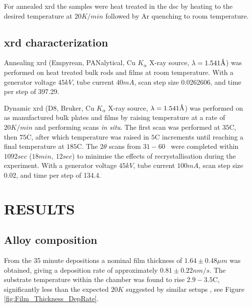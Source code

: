 \documentclass[a4paper,12pt,oneside]{article}%
\begin{document}
For annealed \acrshort{xrd} the samples were heat treated in the \acrshort{dsc} by heating to the desired temperature at $20 K/min$ followed by Ar quenching to room temperature.

\subsection{\acrshort{xrd} characterization}
Annealing \acrshort{xrd} (Empyrean, PANalytical, Cu $K_{\alpha}$ X-ray source, $\lambda = 1.541 \mbox{\normalfont\AA}$) was performed on heat treated bulk rods and films at room temperature. 
With a generator voltage $45 kV$, tube current $40 mA$, scan step size 0.0262606, and time per step of 397.29. 

Dynamic \acrshort{xrd} (D8, Bruker, Cu $K_{\alpha}$ X-ray source, $\lambda = 1.541 \mbox{\normalfont\AA}$) was performed on as manufactured bulk plates and films by raising temperature at a rate of $20 K/min$ and performing scans \textit{in situ}. The first scan was performed at $35$\degree C, then $75$\degree C, after which temperature was raised in $5$\degree C increments until reaching a final temperature at $185$\degree C. The $2 \theta$ scans from $31 - 60$\degree~ were completed within $1092 sec$ ($18min,~ 12sec$) to minimise the effects of recrystallisation during the experiment.
With a generator voltage $45 kV$, tube current $100 mA$, scan step size 0.02, and time per step of 134.4. 


\section{RESULTS}
\subsection{Alloy composition}

From the 35 minute depositions a nominal film thickness of $1.64 \pm 0.48 \mu m$ was obtained, giving a deposition rate of approximately $0.81 \pm 0.22 nm/s$. The substrate temperature within the chamber was found to rise $2.9 - 3.5$\degree C, significantly less than the expected $20K$ suggested by similar setups \cite{Wang2014}, see Figure \ref{fig:Film_Thickness_DepRate}.
\end{document}
